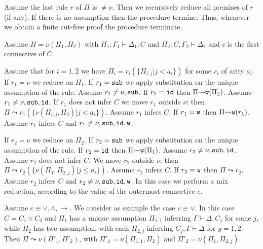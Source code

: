 \documentclass[a4paper,12pt]{article}
\newcommand{\id}              { {\tt id} }
\newcommand{\reduces}         { {\leadsto} }
\newcommand{\sub}             { {\tt sub} }
\newcommand{\Weak} { {\tt w} }
\begin{document}
Assume the last rule $r$ of $\Pi$ is $\not = \nu$. Then we recursively reduce all premises of $r$ (if any). If there is no assumption then the procedure termine. Thus, whenever we obtain a finite cut-free proof the procedure terminate. 

Assume $\Pi = \nu(\Pi_1, \Pi_2)$ with $\Pi_1:\Gamma_1 \vdash \Delta_1, C$ and $\Pi_2:C,\Gamma_2 \vdash \Delta_2$ and $c$ is the first connective of $C$. 


Assume that for $i=1,2$ we have $\Pi_i = r_i(\{\Pi_{i,j} | j <  a_i\})$ for some $r_i$ of arity $a_i$. If $r_1=\nu$ we reduce on $\Pi_1$. If $r_1 = \sub$ we apply substitution on the unique assumption of the rule. Assume $r_1 \not = \nu, \sub$. If $r_1 = \id$ then $\Pi \reduces \Weak(\Pi_2)$.  Assume $r_1 \not = \nu, \sub, \id$.  If $r_1$ does not infer $C$ we move $r_1$ outside $\nu$: then $\Pi \reduces r_1(\{\nu(\Pi_{i,j},\Pi_2) | j <  a_i\})$. Assume $r_1$ infers $C$. If $r_1=\Weak$ then $\Pi \reduces \Weak(r_{1})$.  Assume $r_1$ infers $C$ and $r_1 \not = \nu, \sub, \id, \Weak$.  

If $r_2=\nu$ we reduce on $\Pi_2$.  If $r_2 = \sub$ we apply substitution on the unique assumption of the rule. If $r_2 = \id$ then $\Pi \reduces \Weak(\Pi_1)$.  Assume $r_2 \not = \nu, \sub, \id$.   Assume $r_2$ does not infer $C$. We move $r_2$ outside $\nu$: then $\Pi \reduces r_2(\{ \nu(\Pi_1, \Pi_{2,j}) | j \le a_i\})$. Assume $r_2$ infers $C$. If $r_2=\Weak$ then $\Pi \reduces r_{2}$.   Assume $r_2$ infers $C$ and $r_2 \not = \nu, \sub, \id, \Weak$. In this case we perform a mix reduction, according to the value of the outermost connective $c$. 



Assume $c \equiv \vee, \wedge,\rightarrow$. We consider as example the case $c \equiv \vee$. In this case $C = C_1 \vee C_2$ and $\Pi_1$ has a unique assumption $\Pi_{1,1}$ inferring $\Gamma \vdash \Delta, C_j$ for some $j$, while $\Pi_2$ has two assumption, with each $\Pi_{2,j}$ inferring $C_j, \Gamma \vdash \Delta$ for $y=1,2$. Then $\Pi \reduces \nu(\Pi'_1, \Pi'_2)$, with  $\Pi'_1 = \nu(\Pi_{1,1},\Pi_{2})$ and $\Pi'_2 = \nu(\Pi_{1},\Pi_{2,j})$. 

\end{document}
